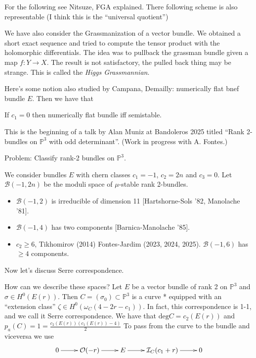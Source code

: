 For the following see Nitsuze, FGA explained.
There following scheme is also representable
(I think this is the ``universal quotient'')

We have also consider the Grassmanization of
a vector bundle.
We obtained a short exact sequence
and tried to compute the tensor product with
the holomorphic differentials.
The idea was to pullback the grassman bundle
given a map $f:Y \to X$.
The result is not satisfactory, the pulled
back
thing may be strange. This is called the
{\it Higgs Grassmannian}.


Here's some notion also studied by Campana,
Demailly:
numerically flat bnef bundle $E$.
Then we have that
\begin{lemma}
\label{lemma-proof-hugo-bruzzo}
If $c_1=0$ then numerically flat bundle iff
semistable.
\end{lemma}

\medskip\noindent
This is the beginning of a talk by Alan Muniz
at Bandoleros 2025 titled
``Rank 2-bundles on $\mathbb{P}^3$ with odd
determinant''.
(Work in progress with A. Fontes.)

Problem: Classify rank-2 bundles on
$\mathbb{P}^3$.

We consider bundles $E$ with chern classes
$c_1=-1$, $c_2=2n$ and $c_3=0$.
Let $\mathcal{B}(-1,2n)$ be the moduli space
of $\mu$-stable rank 2-bundles.

\begin{itemize}
\item $\mathcal{B}(-1,2)$ is irreducible of
dimension 11
[Hartshorne-Sols '82, Manolache '81].

\item $\mathcal{B}(-1,4)$ has two components
[Barnica-Manolache '85].

\item $c_2\geq 6$, Tikhomirov (2014)
Fontes-Jardim (2023, 2024, 2025).
$\mathcal{B}(-1,6)$ has $\geq 4$ components.
\end{itemize}

\medskip\noindent
Now let's discuss Serre correspondence.

How can we describe these spaces?
Let $E$ be a vector bundle of rank 2
on $\mathbb{P}^3$ and $\sigma \in H^0(E(r))$.
Then $C=(\sigma_0)\subset \mathbb{P}^3$ is
a curve * equipped
with an ``extension class''
$\zeta \in H^0(\omega_C(4-2r-c_1))$.
In fact, this correspondence
is 1-1, and we call it Serre correspondence.
We have that $\text{deg}C=c_2(E(r))$ and
$p_a(C)=1=\frac{c_2(E(r))(c_1(E(r))-4)}{2}$
To pass from the curve to the bundle
and viceversa we use
$$
\xymatrix{
0\ar[r]
&\mathcal{O}(-r)\ar[r]
&E\ar[r]
&\mathcal{I}_C(c_1+r)\ar[r]
&0
}
$$


